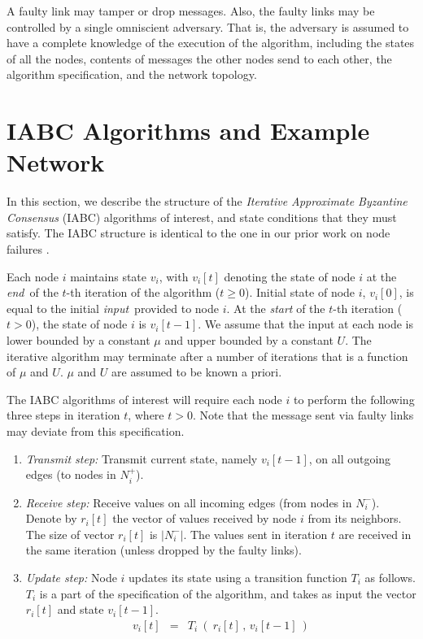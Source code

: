 \documentclass{llncs}
\begin{document}
A faulty link may tamper or drop messages. Also, the faulty links may be controlled by a single omniscient adversary. That is, the adversary is assumed to have a complete knowledge of the execution of
the algorithm, including the states of all the nodes,
contents of messages the other nodes send to each other,
the algorithm specification, and the network topology. 





\section{IABC Algorithms and Example Network}
\label{sec:iacbl}

In this section, we describe the structure of the
{\em Iterative Approximate Byzantine Consensus} (IABC) algorithms of interest, and state conditions that they must satisfy. The IABC structure is identical to the one in our prior work on node failures \cite{vaidya_PODC12,Tseng_general,vaidya_icdcn14}.

Each node $i$ maintains state $v_i$, with $v_i[t]$ denoting the state
of node $i$ at the {\em end}\, of the $t$-th iteration of the algorithm ($t \geq 0$).
Initial state of node $i$, $v_i[0]$, is equal to the initial {\em input}\, provided to node $i$. At the {\em start} of the $t$-th iteration ($t>0$), the state of
node $i$ is $v_i[t-1]$. We assume that the input at each node is lower bounded by a constant $\mu$ and upper bounded by a constant $U$. The
iterative algorithm may terminate after a number of iterations that is a function of $μ$ and $U$. $\mu$ and $U$ are assumed to be known a priori. 

The IABC algorithms of interest will require each node $i$
to perform the following three steps in iteration $t$, where $t>0$.
Note that the message sent via faulty links may deviate from this specification.

\begin{enumerate}
\item {\em Transmit step:} Transmit current state, namely $v_i[t-1]$, on all outgoing edges
 (to nodes in $N_i^+$).

\item {\em Receive step:} Receive values on all incoming edges (from nodes in $N_i^-$). 
Denote by $r_i[t]$ the vector of values received by node $i$ from its
neighbors. The size of vector $r_i[t]$ is $|N_i^-|$. The values sent in iteration $t$ are received in the same iteration (unless dropped by the faulty links).

\item {\em Update step:} Node $i$ updates its state using a transition function $T_i$ as
follows. $T_i$ is a part of the specification of the algorithm, and takes
as input the vector $r_i[t]$ and state $v_i[t-1]$.
\begin{eqnarray}
v_i[t] & = &  T_i ~( ~r_i[t]\,,\,v_i[t-1] ~)
\label{eq:T_i}
\end{eqnarray}



\end{enumerate}
\end{document}
